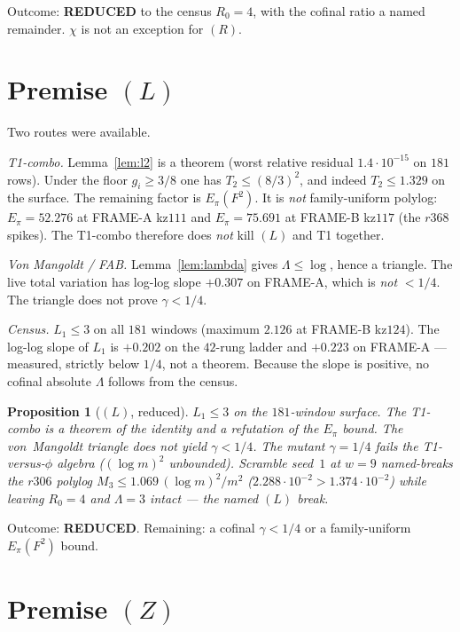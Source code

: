 \documentclass[11pt]{article}
\newtheorem{prop}{Proposition}
\theoremstyle{remark}
\begin{document}
\noindent
Outcome: \textbf{REDUCED} to the census $R_0=4$, with the
cofinal ratio a named remainder.  $\chi$ is not an exception
for $(R)$.

\section{Premise $(L)$}\label{sec:L}

Two routes were available.

\textit{T1-combo.}  Lemma~\ref{lem:l2} is a theorem
(worst relative residual $1.4\cdot 10^{-15}$ on $181$ rows).
Under the floor $g_i\ge 3/8$ one has $T_2\le(8/3)^2$, and
indeed $T_2\le 1.329$ on the surface.  The remaining factor is
$E_\pi(F^2)$.  It is \emph{not} family-uniform polylog:
$E_\pi=52.276$ at FRAME-A kz$111$ and $E_\pi=75.691$ at
FRAME-B kz$117$ (the $r368$ spikes).  The T1-combo therefore
does \emph{not} kill $(L)$ and T1 together.

\textit{Von Mangoldt / FAB.}  Lemma~\ref{lem:lambda} gives
$\Lambda\le\log$, hence a triangle.  The live total variation
has log-log slope $+0.307$ on FRAME-A, which is \emph{not}
$<1/4$.  The triangle does not prove $\gamma<1/4$.

\textit{Census.}  $L_1\le 3$ on all $181$ windows (maximum
$2.126$ at FRAME-B kz$124$).  The log-log slope of $L_1$ is
$+0.202$ on the $42$-rung ladder and $+0.223$ on FRAME-A ---
measured, strictly below $1/4$, not a theorem.  Because the
slope is positive, no cofinal absolute $\Lambda$ follows from
the census.

\begin{prop}[$(L)$, reduced]\label{prop:L}
$L_1\le 3$ on the $181$-window surface.  The T1-combo is a
theorem of the identity and a refutation of the $E_\pi$ bound.
The von~Mangoldt triangle does not yield $\gamma<1/4$.
The mutant $\gamma=1/4$ fails the T1-versus-$\phi$ algebra
($(\log m)^2$ unbounded).  Scramble seed~$1$ at $w=9$
named-breaks the $r306$ polylog
$M_3\le 1.069\,(\log m)^2/m^2$ ($2.288\cdot 10^{-2}>1.374\cdot 10^{-2}$)
while leaving $R_0=4$ and $\Lambda=3$ intact --- the named
$(L)$ break.
\end{prop}

\noindent
Outcome: \textbf{REDUCED}.  Remaining: a cofinal $\gamma<1/4$
or a family-uniform $E_\pi(F^2)$ bound.

\section{Premise $(Z)$}\label{sec:Z}
\end{document}
